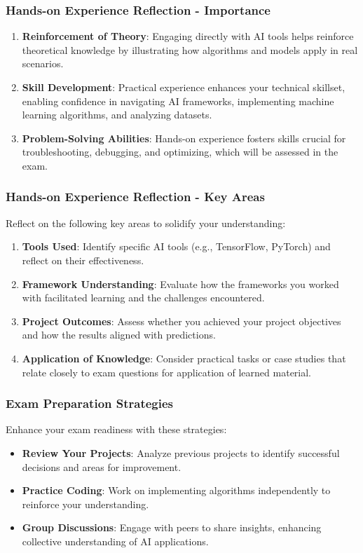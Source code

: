 \documentclass{beamer}
\begin{document}
\begin{frame}[fragile]
    \frametitle{Hands-on Experience Reflection - Importance}
    \begin{enumerate}
        \item \textbf{Reinforcement of Theory}: Engaging directly with AI tools helps reinforce theoretical knowledge by illustrating how algorithms and models apply in real scenarios.
        
        \item \textbf{Skill Development}: Practical experience enhances your technical skillset, enabling confidence in navigating AI frameworks, implementing machine learning algorithms, and analyzing datasets.
        
        \item \textbf{Problem-Solving Abilities}: Hands-on experience fosters skills crucial for troubleshooting, debugging, and optimizing, which will be assessed in the exam.
    \end{enumerate}
\end{frame}

\begin{frame}[fragile]
    \frametitle{Hands-on Experience Reflection - Key Areas}
    Reflect on the following key areas to solidify your understanding:
    \begin{enumerate}
        \item \textbf{Tools Used}: Identify specific AI tools (e.g., TensorFlow, PyTorch) and reflect on their effectiveness.
        
        \item \textbf{Framework Understanding}: Evaluate how the frameworks you worked with facilitated learning and the challenges encountered.
        
        \item \textbf{Project Outcomes}: Assess whether you achieved your project objectives and how the results aligned with predictions.
        
        \item \textbf{Application of Knowledge}: Consider practical tasks or case studies that relate closely to exam questions for application of learned material.
    \end{enumerate}
\end{frame}

\begin{frame}[fragile]
    \frametitle{Exam Preparation Strategies}
    Enhance your exam readiness with these strategies:
    \begin{itemize}
        \item \textbf{Review Your Projects}: Analyze previous projects to identify successful decisions and areas for improvement.
        
        \item \textbf{Practice Coding}: Work on implementing algorithms independently to reinforce your understanding.
        
        \item \textbf{Group Discussions}: Engage with peers to share insights, enhancing collective understanding of AI applications.
    \end{itemize}
\end{frame}
\end{document}
